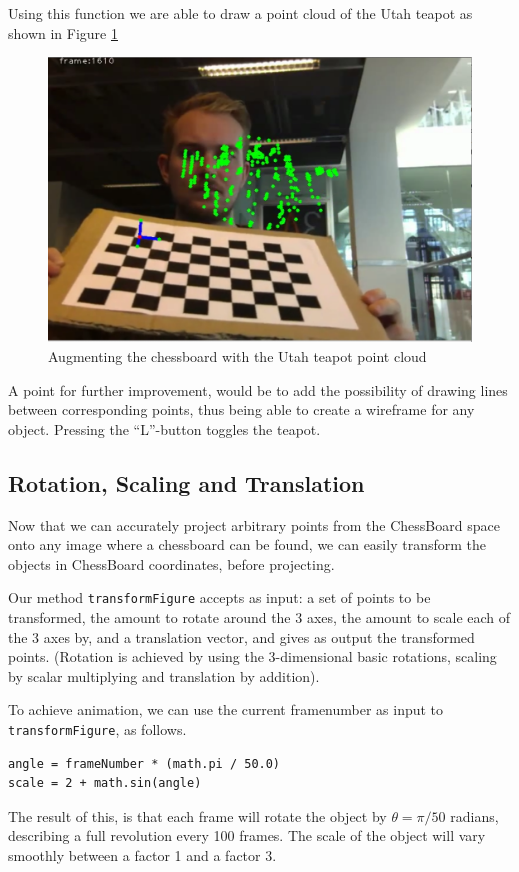 \documentclass[a4paper,11pt]{article}
\begin{document}
Using this function we are able to draw a point cloud of the Utah teapot as shown in Figure \ref{fig:teapot}
\begin{figure}[H]
\centering
\includegraphics[width=0.6\linewidth]{teapot}
\caption{Augmenting the chessboard with the Utah teapot point cloud}
\label{fig:teapot}
\end{figure}

A point for further improvement, would be to add the possibility of drawing lines between corresponding points, thus being able to create a wireframe for any object. Pressing the “L”-button toggles the teapot.

\subsection{Rotation, Scaling and Translation}
Now that we can accurately project arbitrary points from the ChessBoard space onto any image where a chessboard can be found, we can easily transform the objects in ChessBoard coordinates, before projecting.

Our method \texttt{transformFigure} accepts as input: a set of points to be transformed, the amount to rotate around the 3 axes, the amount to scale each of the 3 axes by, and a translation vector, and gives as output the transformed points. (Rotation is achieved by using the 3-dimensional basic rotations, scaling by scalar multiplying and translation by addition).

To achieve animation, we can use the current framenumber as input to \texttt{transformFigure}, as follows.

\begin{lstlisting}
angle = frameNumber * (math.pi / 50.0)
scale = 2 + math.sin(angle)
\end{lstlisting}

The result of this, is that each frame will rotate the object by $\theta = \pi / 50$ radians, describing a full revolution every 100 frames. The scale of the object will vary smoothly between a factor 1 and a factor 3.
\end{document}
